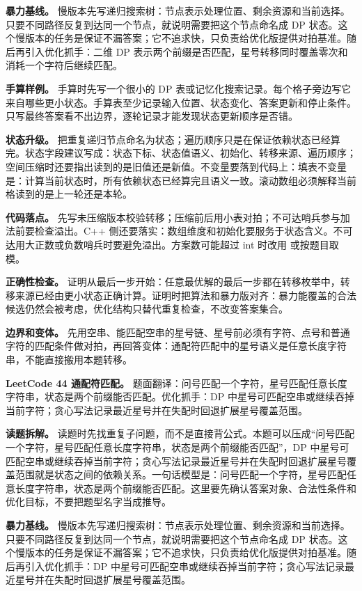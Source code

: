 \textbf{暴力基线。} 慢版本先写递归搜索树：节点表示处理位置、剩余资源和当前选择。只要不同路径反复到达同一个节点，就说明需要把这个节点命名成 DP 状态。这个慢版本的任务是保证不漏答案；它不追求快，只负责给优化版提供对拍基准。随后再引入优化抓手：二维 DP 表示两个前缀是否匹配，星号转移同时覆盖零次和消耗一个字符后继续匹配。

\textbf{手算样例。} 手算时先写一个很小的 DP 表或记忆化搜索记录。每个格子旁边写它来自哪些更小状态。手算表至少记录输入位置、状态变化、答案更新和停止条件。只写最终答案看不出边界，逐轮记录才能发现状态更新顺序是否错。

\textbf{状态升级。} 把重复递归节点命名为状态；遍历顺序只是在保证依赖状态已经算完。状态字段建议写成：状态下标、状态值语义、初始化、转移来源、遍历顺序；空间压缩时还要指出读到的是旧值还是新值。不变量要落到代码上：填表不变量是：计算当前状态时，所有依赖状态已经算完且语义一致。滚动数组必须解释当前格读到的是上一轮还是本轮。

\textbf{代码落点。} 先写未压缩版本校验转移；压缩前后用小表对拍；不可达哨兵参与加法前要检查溢出。C++ 侧还要落实：数组维度和初始化要服务于状态含义。不可达用大正数或负数哨兵时要避免溢出。方案数可能超过 int 时改用  或按题目取模。

\textbf{正确性检查。} 证明从最后一步开始：任意最优解的最后一步都在转移枚举中，转移来源已经由更小状态正确计算。证明时把算法和暴力版对齐：暴力能覆盖的合法候选仍然会被考虑，优化结构只替代重复检查，不改变答案集合。

\textbf{边界和变体。} 先用空串、能匹配空串的星号链、星号前必须有字符、点号和普通字符的匹配条件做对拍，再回答变体：通配符匹配中的星号语义是任意长度字符串，不能直接搬用本题转移。

\noindent\textbf{LeetCode 44 通配符匹配。} 题面翻译：问号匹配一个字符，星号匹配任意长度字符串，状态是两个前缀能否匹配。优化抓手：DP 中星号可匹配空串或继续吞掉当前字符；贪心写法记录最近星号并在失配时回退扩展星号覆盖范围。

\textbf{读题拆解。} 读题时先找重复子问题，而不是直接背公式。本题可以压成“问号匹配一个字符，星号匹配任意长度字符串，状态是两个前缀能否匹配”，DP 中星号可匹配空串或继续吞掉当前字符；贪心写法记录最近星号并在失配时回退扩展星号覆盖范围就是状态之间的依赖关系。一句话模型是：问号匹配一个字符，星号匹配任意长度字符串，状态是两个前缀能否匹配。这里要先确认答案对象、合法性条件和优化目标，不要把题型名字当成推导。

\textbf{暴力基线。} 慢版本先写递归搜索树：节点表示处理位置、剩余资源和当前选择。只要不同路径反复到达同一个节点，就说明需要把这个节点命名成 DP 状态。这个慢版本的任务是保证不漏答案；它不追求快，只负责给优化版提供对拍基准。随后再引入优化抓手：DP 中星号可匹配空串或继续吞掉当前字符；贪心写法记录最近星号并在失配时回退扩展星号覆盖范围。

